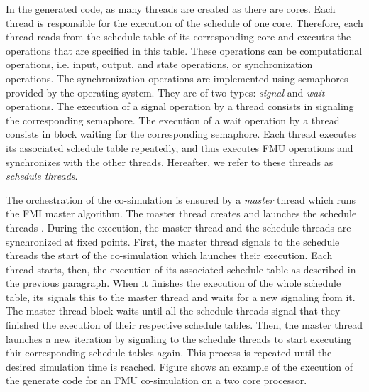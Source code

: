 In the generated code, as many threads are created as there are cores. Each thread is responsible for the execution of the schedule of one core. Therefore, each thread reads from the schedule table of its corresponding core and executes the operations that are specified in this table. These operations can be computational operations, i.e. input, output, and state operations, or synchronization operations. The synchronization operations are implemented using semaphores provided by the operating system. They are of two types: \textit{signal} and \textit{wait} operations. The execution of a signal operation by a thread consists in signaling the corresponding semaphore. The execution of a wait operation by a thread consists in block waiting for the corresponding semaphore. Each thread executes its associated schedule table repeatedly, and thus executes FMU operations and synchronizes with the other threads. Hereafter, we refer to these threads as \textit{schedule threads}. 

The orchestration of the co-simulation is ensured by a \textit{master} thread which runs the FMI master algorithm. The master thread creates and launches the schedule threads . During the execution, the master thread and the schedule threads are synchronized at fixed points. First, the master thread signals to the schedule threads the start of the co-simulation which launches their execution. Each thread starts, then, the execution of its associated schedule table as described in the previous paragraph. When it finishes the execution of the whole schedule table, its signals this to the master thread and waits for a new signaling from it. The master thread block waits until all the schedule threads signal that they finished the execution of their respective schedule tables. Then, the master thread launches a new iteration by signaling to the schedule threads to start executing thir corresponding schedule tables again. This process is repeated until the desired simulation time is reached. Figure shows an example of the execution of the generate code for an FMU co-simulation on a two core processor.

